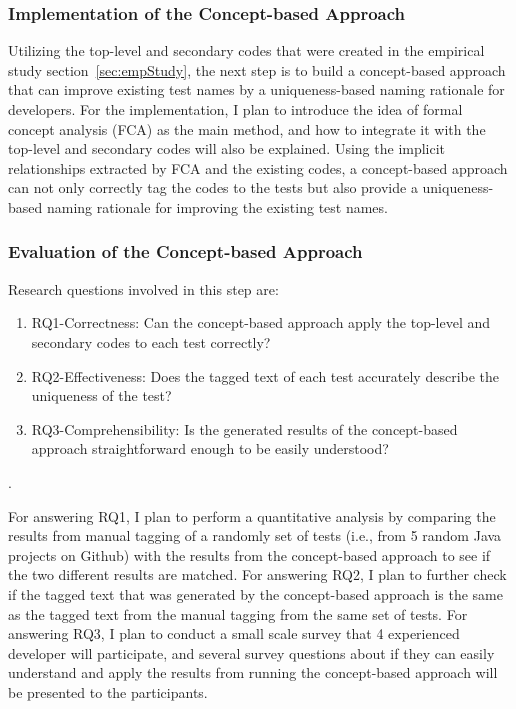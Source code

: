 \subsubsection{Implementation of the Concept-based Approach}

Utilizing the top-level and secondary codes that were created in the empirical study section~\cref{sec:empStudy}, the next step is to build a concept-based approach that can improve existing test names by a uniqueness-based naming rationale for developers.
%
For the implementation, I plan to introduce the idea of formal concept analysis (FCA) as the main method, and how to integrate it with the top-level and secondary codes will also be explained.
%
Using the implicit relationships extracted by FCA and the existing codes, a concept-based approach can not only correctly tag the codes to the tests but also provide a uniqueness-based naming rationale for improving the existing test names.

\subsubsection{Evaluation of the Concept-based Approach}

Research questions involved in this step are:
%
\begin{enumerate}
    \item RQ1-Correctness: Can the concept-based approach apply the top-level and secondary codes to each test correctly?
    \item RQ2-Effectiveness: Does the tagged text of each test accurately describe the uniqueness of the test?
    \item RQ3-Comprehensibility: Is the generated results of the concept-based approach straightforward enough to be easily understood?
\end{enumerate}.

For answering RQ1, I plan to perform a quantitative analysis by comparing the results from manual tagging of a randomly set of tests (i.e., from 5 random Java projects on Github) with the results from the concept-based approach to see if the two different results are matched.
%
For answering RQ2, I plan to further check if the tagged text that was generated by the concept-based approach is the same as the tagged text from the manual tagging from the same set of tests.
%
For answering RQ3, I plan to conduct a small scale survey that 4 experienced developer will participate, and several survey questions about if they can easily understand and apply the results from running the concept-based approach will be presented to the participants.


